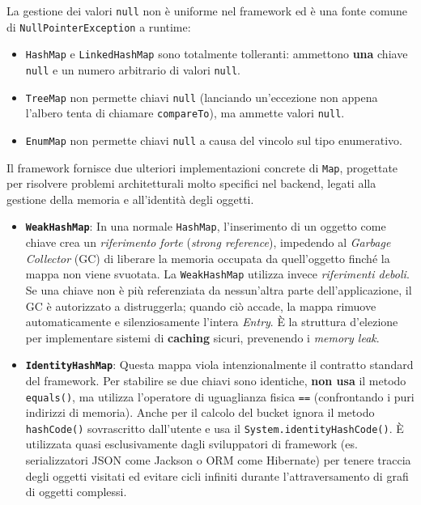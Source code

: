 \begin{warningbox}
La gestione dei valori \texttt{null} non è uniforme nel framework ed è una fonte comune di \texttt{NullPointerException} a runtime:
\begin{itemize}
    \item \texttt{HashMap} e \texttt{LinkedHashMap} sono totalmente tolleranti: ammettono \textbf{una} chiave \texttt{null} e un numero arbitrario di valori \texttt{null}.
    \item \texttt{TreeMap} non permette chiavi \texttt{null} (lanciando un'eccezione non appena l'albero tenta di chiamare \texttt{compareTo}), ma ammette valori \texttt{null}.
    \item \texttt{EnumMap} non permette chiavi \texttt{null} a causa del vincolo sul tipo enumerativo.
\end{itemize}
\end{warningbox}

\begin{dettagli}
Il framework fornisce due ulteriori implementazioni concrete di \texttt{Map}, progettate per risolvere problemi architetturali molto specifici nel backend, legati alla gestione della memoria e all'identità degli oggetti.

\begin{itemize}
    \item \textbf{\texttt{WeakHashMap}}: In una normale \texttt{HashMap}, l'inserimento di un oggetto come chiave crea un \textit{riferimento forte} (\textit{strong reference}), impedendo al \textit{Garbage Collector} (GC) di liberare la memoria occupata da quell'oggetto finché la mappa non viene svuotata. La \texttt{WeakHashMap} utilizza invece \textit{riferimenti deboli}. Se una chiave non è più referenziata da nessun'altra parte dell'applicazione, il GC è autorizzato a distruggerla; quando ciò accade, la mappa rimuove automaticamente e silenziosamente l'intera \textit{Entry}. È la struttura d'elezione per implementare sistemi di \textbf{caching} sicuri, prevenendo i \textit{memory leak}.

    \item \textbf{\texttt{IdentityHashMap}}: Questa mappa viola intenzionalmente il contratto standard del framework. Per stabilire se due chiavi sono identiche, \textbf{non usa} il metodo \texttt{equals()}, ma utilizza l'operatore di uguaglianza fisica \texttt{==} (confrontando i puri indirizzi di memoria). Anche per il calcolo del bucket ignora il metodo \texttt{hashCode()} sovrascritto dall'utente e usa il \texttt{System.identityHashCode()}. È utilizzata quasi esclusivamente dagli sviluppatori di framework (es. serializzatori JSON come Jackson o ORM come Hibernate) per tenere traccia degli oggetti visitati ed evitare cicli infiniti durante l'attraversamento di grafi di oggetti complessi.
\end{itemize}
\end{dettagli}


